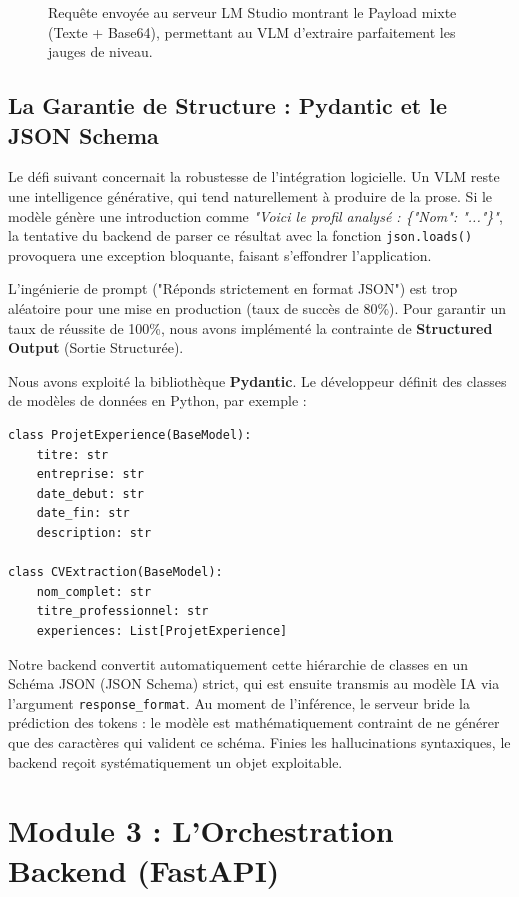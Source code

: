 \begin{figure}[H]
    \centering
    \vspace{7cm} %
    \caption{Requête envoyée au serveur LM Studio montrant le Payload mixte (Texte + Base64), permettant au VLM d'extraire parfaitement les jauges de niveau.}
    \label{fig:vlm_success}
\end{figure}

\subsection{La Garantie de Structure : Pydantic et le JSON Schema}
Le défi suivant concernait la robustesse de l'intégration logicielle. Un VLM reste une intelligence générative, qui tend naturellement à produire de la prose. Si le modèle génère une introduction comme \textit{"Voici le profil analysé : \{"Nom": "..."\}"}, la tentative du backend de parser ce résultat avec la fonction \texttt{json.loads()} provoquera une exception bloquante, faisant s'effondrer l'application.

L'ingénierie de prompt ("Réponds strictement en format JSON") est trop aléatoire pour une mise en production (taux de succès de 80\%). Pour garantir un taux de réussite de 100\%, nous avons implémenté la contrainte de \textbf{Structured Output} (Sortie Structurée).

Nous avons exploité la bibliothèque \textbf{Pydantic}. Le développeur définit des classes de modèles de données en Python, par exemple :

\begin{verbatim}
class ProjetExperience(BaseModel):
    titre: str
    entreprise: str
    date_debut: str
    date_fin: str
    description: str

class CVExtraction(BaseModel):
    nom_complet: str
    titre_professionnel: str
    experiences: List[ProjetExperience]
\end{verbatim}

Notre backend convertit automatiquement cette hiérarchie de classes en un Schéma JSON (JSON Schema) strict, qui est ensuite transmis au modèle IA via l'argument \texttt{response\_format}. Au moment de l'inférence, le serveur bride la prédiction des tokens : le modèle est mathématiquement contraint de ne générer que des caractères qui valident ce schéma. Finies les hallucinations syntaxiques, le backend reçoit systématiquement un objet exploitable.


\section{Module 3 : L'Orchestration Backend (FastAPI)}

